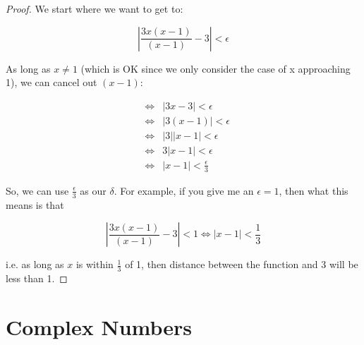 \message{ !name(RealAnalysis.tex)}\documentclass[12pt]{scrbook}
\begin{document}
\begin{proof}
We start where we want to get to:

\[ \left | \frac{3x(x-1)}{(x-1)} - 3 \right | < \epsilon \]

As long as $x \ne 1$ (which is OK since we only consider the case of x approaching 1), we can cancel out $(x - 1)$:

\begin{eqnarray*}
&\Leftrightarrow&  \left | 3x - 3 \right |  < \epsilon \\
&\Leftrightarrow& \left | 3 (x - 1) \right |  < \epsilon \\
&\Leftrightarrow& \left | 3 \right | \left | x - 1 \right | < \epsilon \\
&\Leftrightarrow& 3 \left | x - 1 \right | < \epsilon \\
&\Leftrightarrow& \left | x - 1 \right | < \frac{\epsilon}{3} 
\end{eqnarray*}

So, we can use $\frac{\epsilon}{3}$ as our $\delta$.  For example, if you give me an $\epsilon = 1$, then what this means is that

\[ \left | \frac{3x(x-1)}{(x-1)} - 3 \right | < 1 \Leftrightarrow \left | x-1\right | < \frac{1}{3} \]

i.e. as long as $x$ is within $\frac{1}{3}$ of 1, then distance between the function and 3 will be less than 1.

\end{proof}


\clearpage
\chapter{Complex Numbers}
\end{document}

